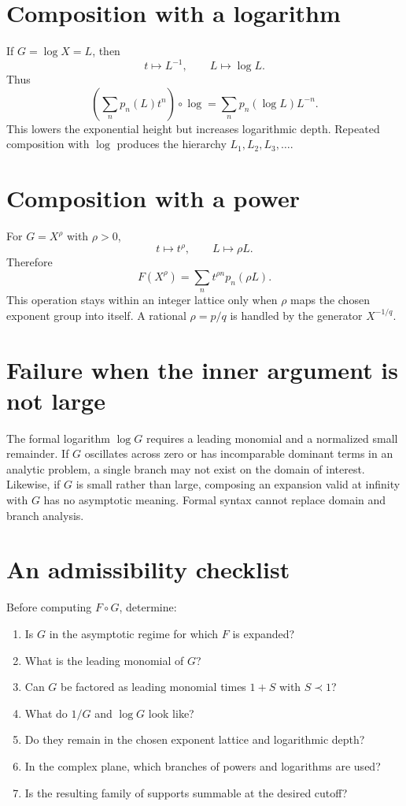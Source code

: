 \documentclass[11pt,oneside]{book}
\theoremstyle{definition}
\theoremstyle{remark}
\newcommand{\precdom}{\prec}
\newcommand{\compose}{\mathbin{\circ}}
\begin{document}
\section{Composition with a logarithm}
If $G=\log X=L$, then
\[
 t\mapsto L^{-1},
 \qquad
 L\mapsto\log L.
\]
Thus
\[
 \left(\sum_np_n(L)t^n\right)\compose\log
 =\sum_np_n(\log L)L^{-n}.
\]
This lowers the exponential height but increases logarithmic depth.  Repeated
composition with $\log$ produces the hierarchy
$L_1,L_2,L_3,\ldots$.

\section{Composition with a power}
For $G=X^\rho$ with $\rho>0$,
\[
 t\mapsto t^\rho,
 \qquad
 L\mapsto\rho L.
\]
Therefore
\begin{equation}\label{eq:composition-power}
 F(X^\rho)=\sum_n t^{\rho n}p_n(\rho L).
\end{equation}
This operation stays within an integer lattice only when $\rho$ maps the
chosen exponent group into itself.  A rational $\rho=p/q$ is handled by the
generator $X^{-1/q}$.

\section{Failure when the inner argument is not large}
The formal logarithm $\log G$ requires a leading monomial and a normalized
small remainder.  If $G$ oscillates across zero or has incomparable dominant
terms in an analytic problem, a single branch may not exist on the domain of
interest.  Likewise, if $G$ is small rather than large, composing an expansion
valid at infinity with $G$ has no asymptotic meaning.  Formal syntax cannot
replace domain and branch analysis.

\section{An admissibility checklist}
Before computing $F\compose G$, determine:
\begin{enumerate}
\item Is $G$ in the asymptotic regime for which $F$ is expanded?
\item What is the leading monomial of $G$?
\item Can $G$ be factored as leading monomial times $1+S$ with $S\precdom1$?
\item What do $1/G$ and $\log G$ look like?
\item Do they remain in the chosen exponent lattice and logarithmic depth?
\item In the complex plane, which branches of powers and logarithms are used?
\item Is the resulting family of supports summable at the desired cutoff?
\end{enumerate}
\end{document}
